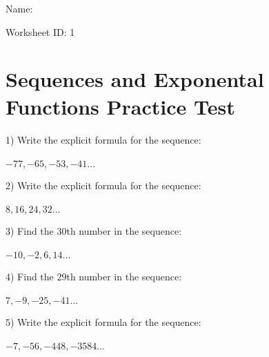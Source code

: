 \documentclass[12pt]{article}
\begin{document}
\begin{flushright}
Name: \underline{\hspace{2.5 in}}
\end{flushright}
\begin{flushright}
Worksheet ID: 1
\end{flushright}
\section*{Sequences and Exponental Functions Practice Test}




1) Write the explicit formula for the sequence: \\ \\
$-77, -65, -53, -41 \ldots $ 

\hrulefill



2) Write the explicit formula for the sequence: \\ \\
$8, 16, 24, 32 \ldots $ 

\hrulefill






3) Find the 30th number in the sequence: \\ \\
$-10, -2, 6, 14  . . .$ 


\hrulefill




4) Find the 29th number in the sequence: \\ \\
$7, -9, -25, -41  . . .$ 


\hrulefill





5) Write the explicit formula for the sequence: \\ \\
$-7, -56, -448, -3584\ldots $
\end{document}
